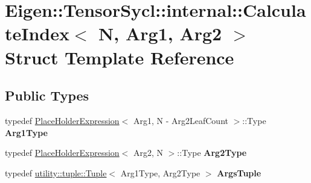 \hypertarget{struct_eigen_1_1_tensor_sycl_1_1internal_1_1_calculate_index_3_01_n_00_01_arg1_00_01_arg2_01_4}{}\section{Eigen\+:\+:Tensor\+Sycl\+:\+:internal\+:\+:Calculate\+Index$<$ N, Arg1, Arg2 $>$ Struct Template Reference}
\label{struct_eigen_1_1_tensor_sycl_1_1internal_1_1_calculate_index_3_01_n_00_01_arg1_00_01_arg2_01_4}
\subsection*{Public Types}
\begin{DoxyCompactItemize}
\item 
\mbox{\label{struct_eigen_1_1_tensor_sycl_1_1internal_1_1_calculate_index_3_01_n_00_01_arg1_00_01_arg2_01_4_ac6c7df20f06022f5932043b3aa8d65dd}} 
typedef \hyperlink{struct_eigen_1_1_tensor_sycl_1_1internal_1_1_place_holder_expression}{Place\+Holder\+Expression}$<$ Arg1, N -\/ Arg2\+Leaf\+Count $>$\+::Type {\bfseries Arg1\+Type}
\item 
\mbox{\label{struct_eigen_1_1_tensor_sycl_1_1internal_1_1_calculate_index_3_01_n_00_01_arg1_00_01_arg2_01_4_a6c055f3af77c9a09fb2fe8093b99a1a5}} 
typedef \hyperlink{struct_eigen_1_1_tensor_sycl_1_1internal_1_1_place_holder_expression}{Place\+Holder\+Expression}$<$ Arg2, N $>$\+::Type {\bfseries Arg2\+Type}
\item 
\mbox{\label{struct_eigen_1_1_tensor_sycl_1_1internal_1_1_calculate_index_3_01_n_00_01_arg1_00_01_arg2_01_4_ac40017c48fed1f4b9a3338c43cbc46c7}} 
typedef \hyperlink{structutility_1_1tuple_1_1_tuple}{utility\+::tuple\+::\+Tuple}$<$ Arg1\+Type, Arg2\+Type $>$ {\bfseries Args\+Tuple}
\item 
\mbox{\label{struct_eigen_1_1_tensor_sycl_1_1internal_1_1_calculate_index_3_01_n_00_01_arg1_00_01_arg2_01_4_ac6c7df20f06022f5932043b3aa8d65dd}} 

\end{DoxyCompactItemize}
